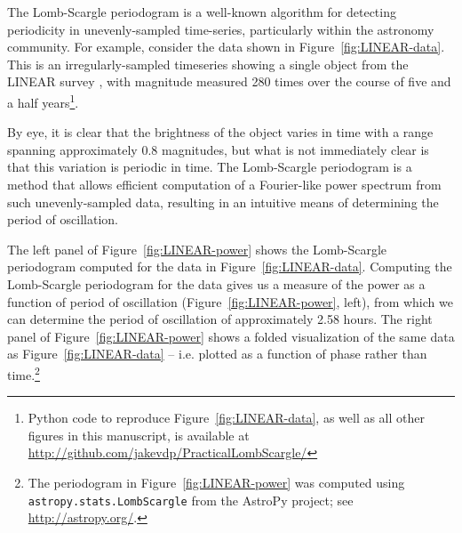 \documentclass[preprint]{aastex}
\newcommand{\fig}[1]{Figure~\ref{fig:#1}}
\begin{document}
The Lomb-Scargle periodogram \citep{Lomb76, Scargle82}
is a well-known algorithm for detecting periodicity
in unevenly-sampled time-series, particularly within the astronomy community.
For example, consider the data shown in \fig{LINEAR-data}.
This is an irregularly-sampled timeseries showing a single object from the
LINEAR survey \citep{LINEAR1, LINEAR3}, with magnitude measured 280 times over
the course of five and a half years\footnote{
  Python code to reproduce \fig{LINEAR-data}, as well as all other figures
  in this manuscript, is available at 
  \url{http://github.com/jakevdp/PracticalLombScargle/}}.

By eye, it is clear that the brightness of the object varies in time with a range spanning approximately 0.8 magnitudes, but what is not immediately clear is that this variation is periodic in time.
The Lomb-Scargle periodogram is a method that allows efficient computation of a Fourier-like power spectrum from such unevenly-sampled data, resulting in an intuitive means of determining the period of oscillation.

The left panel of \fig{LINEAR-power} shows the Lomb-Scargle periodogram computed for the data in \fig{LINEAR-data}.
Computing the Lomb-Scargle periodogram for the data gives us a measure of the
power as a function of period of oscillation (\fig{LINEAR-power}, left), from
which we can determine the period of oscillation of approximately 2.58 hours.
The right panel of \fig{LINEAR-power} shows a folded visualization of
the same data as \fig{LINEAR-data} -- i.e.{} plotted as a function of phase
rather than time.\footnote{
    The periodogram in \fig{LINEAR-power} was computed using
    {\tt astropy.stats.LombScargle}
    from the AstroPy project; see \url{http://astropy.org/}.
}
\end{document}

